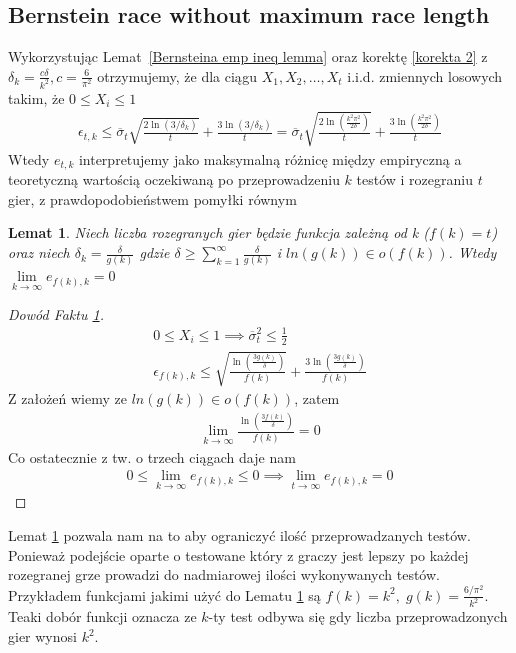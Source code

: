 \documentclass[inzynierska]{pwr_wmat_praca_dyplomowa}
\theoremstyle{plain}
\numberwithin{theorem}{chapter}
\newtheorem{lemma}[theorem]{Lemat}
\theoremstyle{definition}
\numberwithin{theorem}{chapter}
\begin{document}
	\subsection{Bernstein race without maximum race length}
	Wykorzystując Lemat~\ref{Bernsteina emp ineq lemma} oraz korektę \ref{korekta 2} z $\delta_k=\frac{c\delta}{k^2}, c=\frac{6}{\pi^2}$ otrzymujemy, że dla ciągu $X_1,X_2,\dots,X_t$ i.i.d. zmiennych losowych takim, że  $0 \le X_i \le 1$ 
	\begin{align*}
		\label{Bernstein race without maximum race length}
		\epsilon_{t,k} \le \overline{\sigma}_t \sqrt{\frac{2\ln(3/\delta_k)}{t}} + \frac{3  \ln{(3 / \delta_k)}}{t} =
		\overline{\sigma}_t\sqrt{\frac{2\ln(\frac{k^2\pi^2}{2\delta})}{t}} + \frac{3  \ln{(\frac{k^2\pi^2}{2\delta})}}{t}
	\end{align*}
	Wtedy $e_{t,k}$ interpretujemy jako maksymalną różnicę między empiryczną a teoretyczną wartością oczekiwaną po przeprowadzeniu $k$ testów i rozegraniu $t$ gier, z prawdopodobieństwem pomyłki równym 
	\begin{lemma}
		\label{lemma Bernstein race without maximum race length}
		Niech liczba rozegranych gier będzie funkcja zależną od k ($f(k) = t$) oraz niech $\delta_k = \frac{\delta}{g(k)}$
		gdzie $\delta \ge \displaystyle\sum_{k=1}^{\infty} \frac{\delta}{g(k)}$ i $ln(g(k)) \in o(f(k))$. Wtedy
		$\lim\limits_{k\to\infty} e_{f(k),k} = 0$ 
	\end{lemma}
	\begin{proof}[Dowód Faktu \ref{lemma Bernstein race without maximum race length}]
		\begin{gather*}
			0\le X_i \le 1 \implies \overline{\sigma}_t^2 \le \frac{1}{2}\\
			\epsilon_{f(k), k} \le  \sqrt{\frac{\ln(\frac{3g(k)}{\delta})}{f(k)}} + \frac{3  \ln{(\frac{3g(k)}{\delta})}}{f(k)}
		\end{gather*}
		Z założeń wiemy ze $ln(g(k)) \in o(f(k))$, zatem
		\begin{gather*}
			\lim\limits_{k\to\infty} \frac{  \ln{(\frac{3f(k)}{\delta})}}{f(k)} = 0
		\end{gather*}
		Co ostatecznie z tw. o trzech ciągach daje nam
		\begin{gather*}
			0\le \lim\limits_{k\to\infty} e_{f(k), k} \le 0 \implies \lim\limits_{t\to\infty} e_{f(k), k} = 0
		\end{gather*}
	\end{proof}
	Lemat \ref{lemma Bernstein race without maximum race length} pozwala nam na to aby ograniczyć ilość przeprowadzanych testów. Ponieważ podejście oparte o testowane który z graczy jest lepszy po każdej rozegranej grze prowadzi do nadmiarowej ilości wykonywanych testów.
	Przykładem funkcjami jakimi użyć do Lematu \ref{lemma Bernstein race without maximum race length} są $f(k) = k^2,\; g(k) = \frac{6/\pi^2}{k^2}$. Teaki dobór funkcji oznacza ze $k$-ty test odbywa się gdy liczba przeprowadzonych gier wynosi $k^2$.
	
\end{document}
